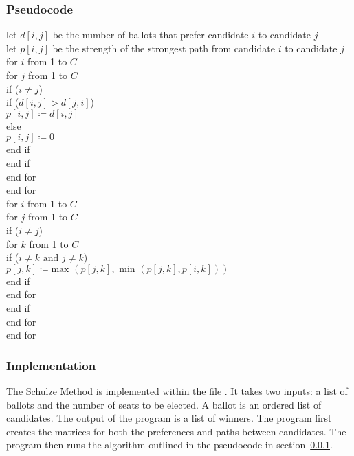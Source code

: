 \documentclass[12pt]{article}
\begin{document}
\subsubsection{Pseudocode}
\label{alg:schulze psuedocode}
let $d[i,j]$ be the number of ballots that prefer candidate $i$ to candidate $j$\\
let $p[i,j]$ be the strength of the strongest path from candidate $i$ to candidate $j$\\
for $i$ from 1 to $C$\\
\tab for $j$ from 1 to $C$\\
\tab\tab if ($i \ne j$)\\
\tab\tab\tab if ($d[i,j] > d[j,i]$)\\
\tab\tab\tab\tab $p[i,j] \coloneqq d[i,j]$\\
\tab\tab\tab else\\
\tab\tab\tab\tab $p[i,j] \coloneqq 0$\\
\tab\tab\tab end if \\
\tab\tab end if \\
\tab end for \\
end for\\
for $i$ from 1 to $C$\\
\tab for $j$ from 1 to $C$\\
\tab\tab if ($i \ne j$)\\
\tab\tab\tab for $k$ from 1 to $C$\\
\tab\tab\tab\tab if ($i \ne k \text{ and } j \ne k$)\\
\tab\tab\tab\tab\tab $p[j,k] \coloneqq \text{max }(p[j,k], \text{ min }(p[j,k], p[i,k]))$\\
\tab\tab\tab\tab end if \\
\tab\tab\tab end for \\
\tab\tab end if \\
\tab end for \\
end for\\
\subsubsection{Implementation}
The Schulze Method is implemented within the file . It takes two inputs: a list of ballots and the number of seats to be elected. A ballot is an ordered list of candidates. The output of the program is a list of winners. The program first creates the matrices for both the preferences and paths between candidates.
The program then runs the algorithm outlined in the pseudocode in section~\ref{alg:schulze psuedocode}.
\end{document}
